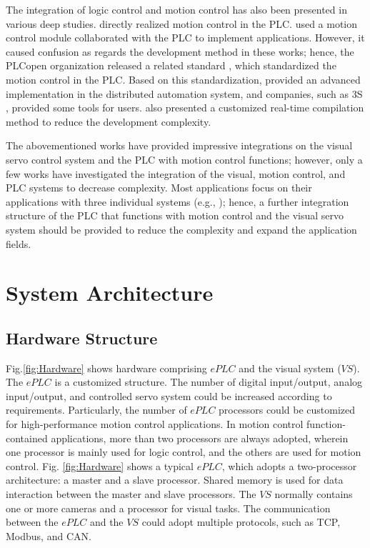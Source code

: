 \documentclass[journal,UTF8]{IEEEtran}
\begin{document}
	The integration of logic control and motion control has also been presented in various deep studies\cite{Ioannides2004Design,Shi2016The,Fang2017Design}. \cite{Ioannides2004Design,syaichu2011model} directly realized motion control in the PLC. \cite{Qian2014A, OMRON2006CS1W} used a motion control module collaborated with the PLC to implement applications. However, it caused confusion as regards the development method in these works; hence, the PLCopen organization released a related standard \cite{PLCopen2005Function}, which standardized the motion control in the PLC. Based on this standardization, \cite{S2006Advanced} provided an advanced implementation in the distributed automation system, and companies, such as 3S \cite{3S2017Logic}, provided some tools for users. \cite{wu2018customized} also presented a customized real-time compilation method to reduce the development complexity.
	
	The abovementioned works have provided impressive integrations on the visual servo control system and the PLC with motion control functions; however, only a few works have investigated the integration of the visual, motion control, and PLC systems to decrease complexity. Most applications focus on their applications with three individual systems (e.g., \cite{Chen2014A}); hence, a further integration structure of the PLC that functions with motion control and the visual servo system should be provided to reduce the complexity and expand the application fields.
	
	
	
	\section{System Architecture}
	\label{SystemStructure}
	\subsection{Hardware Structure}
	Fig.\ref{fig:Hardware} shows hardware comprising $ePLC$ and the visual system ($VS$). The $ePLC$ is a customized structure. The number of digital input/output, analog input/output, and controlled servo system could be increased according to requirements. Particularly, the number of $ePLC$ processors could be customized for high-performance motion control applications. In motion control function-contained applications, more than two processors are always adopted, wherein one processor is mainly used for logic control, and the others are used for motion control. Fig. \ref{fig:Hardware} shows a typical $ePLC$, which adopts a two-processor architecture: a master and a slave processor. Shared memory is used for data interaction between the master and slave processors. The $VS$ normally contains one or more cameras and a processor for visual tasks. The communication between the $ePLC$ and the $VS$ could adopt multiple protocols, such as TCP, Modbus, and CAN.
	
\end{document}
